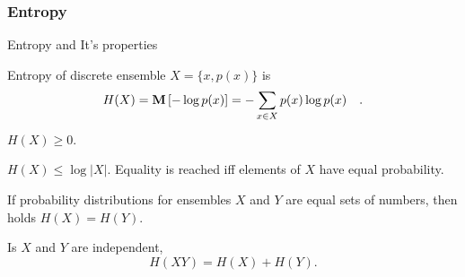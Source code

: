 \documentclass[14pt]{beamer}
\begin{document}
\begin{frame}
\frametitle{Entropy}
Entropy and It's properties
\begin{itemize}
\small{

    \item Entropy of discrete ensemble $X = \{x,p(x)\}$ is
    \[
    H(X) = {\rm {\bf M}}\left[ { - \log p(x)} \right] = - \sum\limits_{x \in X}
    {p(x)\log p(x)} \quad .
    \]

    \item[1]    
    \begin{prop}
    \label{E1} $H(X) \ge 0.$
    \end{prop}

    \item[2]
    \begin{prop}
    \label{E2}
    $H(X) \le \log \left| X \right|.$
    Equality is reached iff elements of $X$ have equal probability.
    \end{prop}

    \item[3]
    \begin{prop}
    \label{E3}
    If probability distributions for ensembles $X$ and $Y$ are equal sets of numbers, then holds $H(X) = H(Y).$
    \end{prop}
    
    \item[4]
    \begin{prop}
    \label{E4}
    Is $X$ and $Y$ are independent,
    \[
    H(XY) = H(X) + H(Y).
    \]
    \end{prop}
}
\end{itemize}
\end{frame}
\end{document}
